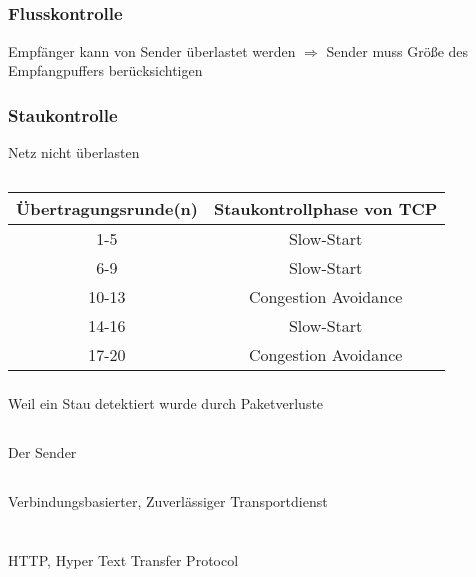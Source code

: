 \documentclass[a4paper]{article}
\begin{document}
\subsection{}
\subsubsection{Flusskontrolle}
Empfänger kann von Sender überlastet werden
$\Rightarrow$ Sender muss Größe des Empfangpuffers berücksichtigen
\subsubsection{Staukontrolle}
Netz nicht überlasten
\subsection{}
\subsubsection{}
\begin{tabular}{|c|c|}\hline
Übertragungsrunde(n) & Staukontrollphase von TCP \\ \hline
1-5 & Slow-Start\\ \hline
6-9 & Slow-Start\\ \hline
10-13 & Congestion Avoidance\\ \hline
14-16 & Slow-Start\\ \hline
17-20 & Congestion Avoidance\\ \hline
\end{tabular}
\subsubsection{}
Weil ein Stau detektiert wurde durch Paketverluste
\subsection{}
Der Sender
\subsection{}
Verbindungsbasierter, Zuverlässiger Transportdienst
\pagebreak
\section{}
\subsection{}
HTTP, Hyper Text Transfer Protocol
\end{document}
